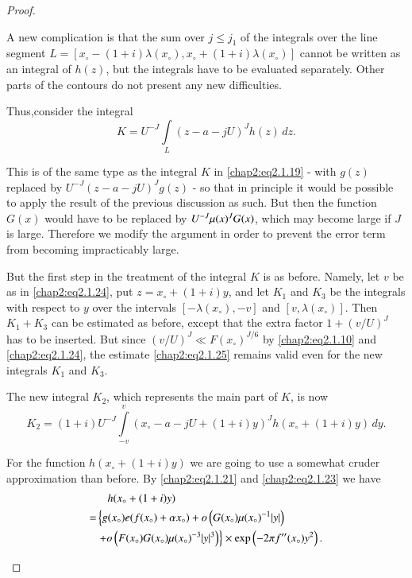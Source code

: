 \begin{proof}
\begin{enumerate}
A new complication is that the sum over $j\leq j_1$ of the integrals
over the line segment $L=[x_\circ -(1+i)\lambda(x_\circ), x_\circ
  +(1+i)\lambda(x_\circ)]$ cannot be written as an integral of $h(z)$,
but the integrals have to be evaluated separately. Other parts of the
contours do not present any new difficulties.

Thus,\pageoriginale consider the integral
\begin{equation}\label{chap2:eq2.1.30}
K=U^{-J}\int\limits_L(z-a-jU)^J h(z)\,dz.
\end{equation}

This is of the same type as the integral $K$ in \eqref{chap2:eq2.1.19}
- with $g(z)$ replaced by $U^{-J}(z-a-jU)^Jg(z)$ - so that in
principle it would be possible to apply the result of the previous
discussion as such. But then the function $G(x)$ would have to be
replaced by $U^{-J}\mu(x)^J\break G(x)$, which may become large if $J$ is
large. Therefore we modify the argument in order to prevent the error
term from becoming impracticably large.

But the first step in the treatment of the integral $K$ is as
before. Namely, let $v$ be as in \eqref{chap2:eq2.1.24}, put
$z=x_\circ +(1+i)y$, and let $K_1$ and $K_3$ be the integrals with
respect to $y$ over the intervals $[-\lambda(x_\circ),-v]$ and $[v,
\lambda(x_\circ)]$. Then $K_1+K_3$ can be estimated as before, except
that the extra factor $1+(v/U)^J$ has to be inserted. But since
$(v/U)^J \ll F(x_\circ)^{J/6}$ by \eqref{chap2:eq2.1.10} and
\eqref{chap2:eq2.1.24}, the estimate \eqref{chap2:eq2.1.25} remains
valid even for the new integrals $K_1$ and $K_3$.

The new integral $K_2$, which represents the main part of $K$, is now 
$$
K_2=(1+i)U^{-J}\int\limits_{-v}^v(x_\circ-a-jU+(1+i)y)^J h(x_\circ+
(1+i)y)\,dy.
$$

For the function $h(x_\circ+(1+i)y)$ we are going to use a somewhat
cruder approximation than before. By \eqref{chap2:eq2.1.21} and
\eqref{chap2:eq2.1.23} we have 
\begin{align}
& \quad h(x_\circ+(1+i)y)\label{chap2:eq2.1.31}\\
=& \left\{g(x_\circ)e(f(x_\circ)+\alpha x_\circ)+o\left(G(x_\circ)\mu
(x_\circ)^{-1}|y|\right)\right.\notag\\
& \left.+o\left(F(x_\circ)G(x_\circ)\mu(x_\circ)^{-3}
|y|^3\right)\right\}\times \exp\left(-2\pi f''(x_\circ)y^2\right).\notag
\end{align}


\end{enumerate}
\end{proof}
